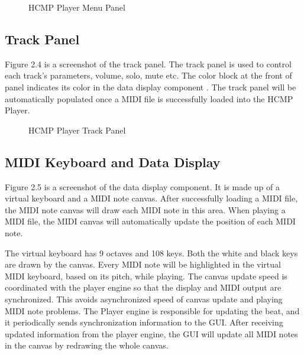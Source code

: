 \begin{figure}[H]
\caption{HCMP Player Menu Panel}
\end{figure}

\subsection{Track Panel}

Figure 2.4 is a screenshot of the track panel. The track panel is used to 
control each track's parameters, volume, solo, mute etc. The color
block at the front of panel indicates its color in the data display component . The 
track panel will be automatically populated once a MIDI file is successfully 
loaded into the HCMP Player.
\begin{figure}[H]
\caption{HCMP Player Track Panel}
\end{figure}

\subsection{MIDI Keyboard and Data Display}
Figure 2.5 is a screenshot of the data display component. It is made up of a virtual  
keyboard and a MIDI note canvas. After successfully loading a MIDI file, the MIDI 
note canvas will 
draw each MIDI note in this area. When playing a MIDI file, the MIDI canvas will 
automatically update the position of each MIDI note. 

The virtual keyboard has 9 octaves and 108 keys. Both the white and black keys 
are drawn by the canvas. Every MIDI note will be highlighted in the 
virtual MIDI keyboard, based on its pitch, while playing. The canvas update speed is 
coordinated with the player engine so that the display and MIDI 
output are synchronized. This avoids asynchronized speed 
of canvas update and playing MIDI note problems. The Player engine is responsible for 
updating the beat, and it 
periodically sends synchronization information to the GUI. After receiving updated 
information from the player engine, the GUI will update all MIDI notes in the canvas by 
redrawing the whole canvas.

